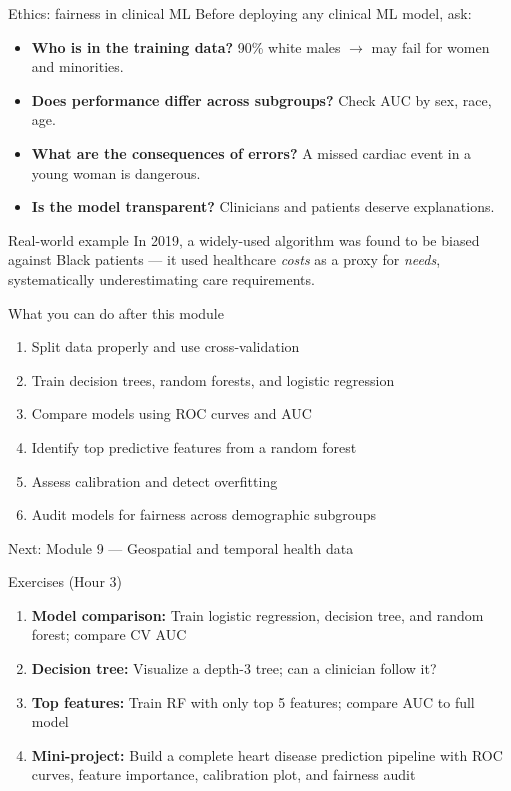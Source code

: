 \documentclass[aspectratio=169,11pt]{beamer}
\begin{document}
\begin{frame}{Ethics: fairness in clinical ML}
Before deploying any clinical ML model, ask:

\begin{itemize}
  \item \textbf{Who is in the training data?} 90\% white males $\to$ may fail for women and minorities.
  \item \textbf{Does performance differ across subgroups?} Check AUC by sex, race, age.
  \item \textbf{What are the consequences of errors?} A missed cardiac event in a young woman is dangerous.
  \item \textbf{Is the model transparent?} Clinicians and patients deserve explanations.
\end{itemize}

\begin{alertblock}{Real-world example}
In 2019, a widely-used algorithm was found to be biased against Black patients --- it used healthcare \emph{costs} as a proxy for \emph{needs}, systematically underestimating care requirements.
\end{alertblock}
\end{frame}

\begin{frame}{What you can do after this module}
\begin{enumerate}
  \item Split data properly and use cross-validation
  \item Train decision trees, random forests, and logistic regression
  \item Compare models using ROC curves and AUC
  \item Identify top predictive features from a random forest
  \item Assess calibration and detect overfitting
  \item Audit models for fairness across demographic subgroups
\end{enumerate}

\vspace{12pt}
\centering
\Large \alert{Next: Module 9 --- Geospatial and temporal health data}
\end{frame}

\begin{frame}{Exercises (Hour 3)}
\begin{enumerate}
  \item \textbf{Model comparison:} Train logistic regression, decision tree, and random forest; compare CV AUC
  \item \textbf{Decision tree:} Visualize a depth-3 tree; can a clinician follow it?
  \item \textbf{Top features:} Train RF with only top 5 features; compare AUC to full model
  \item \textbf{Mini-project:} Build a complete heart disease prediction pipeline with ROC curves, feature importance, calibration plot, and fairness audit
\end{enumerate}
\end{frame}
\end{document}
